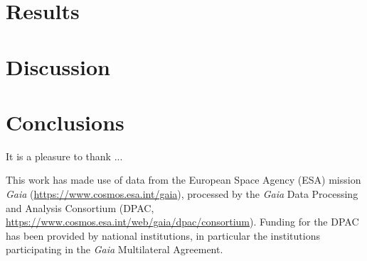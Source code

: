 \section{Results} \label{sec:results}


\section{Discussion} \label{sec:discussion}


\section{Conclusions} \label{sec:conclusions}


\begin{acknowledgements}

It is a pleasure to thank ...



This work has made use of data from the European Space Agency (ESA) mission
{\it Gaia} (\url{https://www.cosmos.esa.int/gaia}), processed by the {\it Gaia}
Data Processing and Analysis Consortium (DPAC,
\url{https://www.cosmos.esa.int/web/gaia/dpac/consortium}). Funding for the DPAC
has been provided by national institutions, in particular the institutions
participating in the {\it Gaia} Multilateral Agreement.

\end{acknowledgements}

